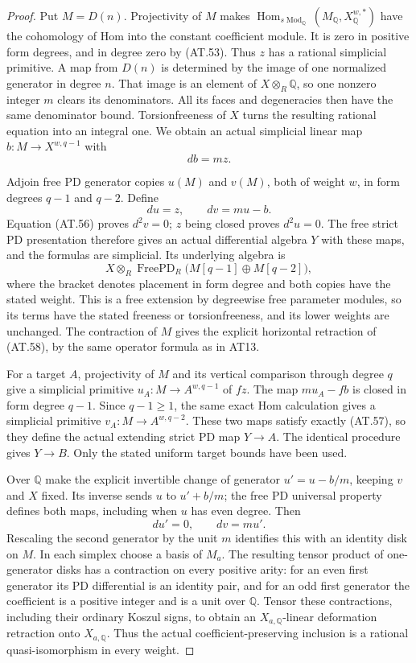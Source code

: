 \begin{proof}
Put $M=D(n)$.  Projectivity of $M$ makes
$\operatorname{Hom}_{s\operatorname{Mod}_{\mathbb Q}}
(M_{\mathbb Q},X_{\mathbb Q}^{w,*})$
have the cohomology of Hom into the constant
coefficient module.  It is zero in positive form
degrees, and in degree zero by \textup{(AT.53)}.
Thus $z$ has a rational simplicial primitive.
A map from $D(n)$ is determined by the image of
one normalized generator in degree $n$.
That image is an element of $X\otimes_R\mathbb Q$,
so one nonzero integer $m$ clears its denominators.
All its faces and degeneracies then have the same
denominator bound.  Torsionfreeness of $X$ turns
the resulting rational equation into an integral
one.  We obtain an actual simplicial
linear map $b:M\to X^{w,q-1}$ with
\[
                              db=mz.
 \tag{AT.56}
\]

Adjoin free PD generator copies $u(M)$ and $v(M)$,
both of weight $w$, in form degrees $q-1$ and $q-2$.
Define
\[
                     du=z,\qquad dv=mu-b.
 \tag{AT.57}
\]
Equation \textup{(AT.56)} proves $d^2v=0$;
$z$ being closed proves $d^2u=0$.
The free strict PD presentation therefore gives
an actual differential algebra $Y$ with these maps,
and the formulas are simplicial.
Its underlying algebra is
\[
 X\otimes_R
 \operatorname{FreePD}_R\bigl(M[q-1]\oplus M[q-2]\bigr),
 \tag{AT.58}
\]
where the bracket denotes placement in form degree
and both copies have the stated weight.
This is a free extension by degreewise free parameter
modules, so its terms have the stated freeness or
torsionfreeness, and its lower weights are unchanged.
The contraction of $M$ gives the explicit horizontal
retraction of \textup{(AT.58)}, by the same operator
formula as in AT13.

For a target $A$, projectivity of $M$ and its
vertical comparison through degree $q$ give a
simplicial primitive $u_A:M\to A^{w,q-1}$ of $fz$.
The map $m u_A-fb$ is closed in form degree $q-1$.
Since $q-1\geq1$, the same exact Hom calculation
gives a simplicial primitive
$v_A:M\to A^{w,q-2}$.
These two maps satisfy exactly \textup{(AT.57)},
so they define the actual extending strict PD map
$Y\to A$.  The identical procedure gives $Y\to B$.
Only the stated uniform target bounds have been used.

Over $\mathbb Q$ make the explicit invertible
change of generator $u'=u-b/m$, keeping $v$ and
$X$ fixed.  Its inverse sends $u$ to $u'+b/m$;
the free PD universal property defines both maps,
including when $u$ has even degree.
Then
\[
                         du'=0,\qquad dv=mu'.
 \tag{AT.59}
\]
Rescaling the second generator by the unit $m$
identifies this with an identity disk on $M$.
In each simplex choose a basis of $M_a$.
The resulting tensor product of one-generator
disks has a contraction on every positive arity:
for an even first generator its PD differential
is an identity pair, and for an odd first generator
the coefficient is a positive integer and is a
unit over $\mathbb Q$.
Tensor these contractions, including their ordinary
Koszul signs, to obtain an $X_{a,\mathbb Q}$-linear
deformation retraction onto $X_{a,\mathbb Q}$.
Thus the actual coefficient-preserving inclusion
is a rational quasi-isomorphism in every weight.


\end{proof}
